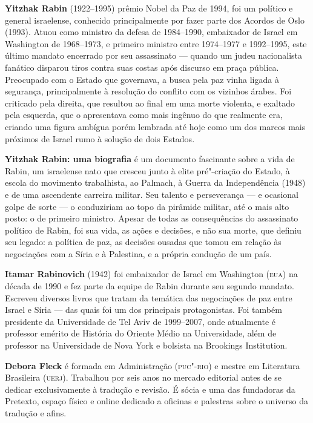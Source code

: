\textbf{Yitzhak Rabin} (1922--1995) prêmio Nobel da Paz de 1994, foi um político e general israelense, conhecido principalmente por fazer parte dos Acordos de Oslo (1993). Atuou como ministro da defesa de 1984--1990, embaixador de Israel em Washington de 1968--1973, e primeiro ministro entre 1974--1977 e 1992--1995, este último mandato encerrado por seu assassinato --- quando um judeu nacionalista fanático disparou tiros contra suas costas após discurso em praça pública. Preocupado com o Estado que governava, a busca pela paz vinha ligada à segurança, principalmente à resolução do conflito com os vizinhos árabes. Foi criticado pela direita, que resultou ao final em uma morte violenta, e exaltado pela esquerda, que o apresentava como mais ingênuo do que realmente era, criando uma figura ambígua porém lembrada até hoje como um dos marcos mais próximos de Israel rumo à solução de dois Estados.

\textbf{Yitzhak Rabin: uma biografia} é um documento fascinante sobre a vida de Rabin, um israelense nato que cresceu junto à elite pré"-criação do Estado, à escola do movimento trabalhista, ao Palmach, à Guerra da Independência (1948) e de uma ascendente carreira militar. Seu talento e perseverança --- e ocasional golpe de sorte --- o conduziriam ao topo da pirâmide militar, até o mais alto posto: o de primeiro ministro. Apesar de todas as consequências do assassinato político de Rabin, foi sua vida, as ações e decisões, e não sua morte, que definiu seu legado: a política de paz, as decisões ousadas que tomou em relação às negociações com a Síria e à Palestina, e a própria condução de um país.

\textbf{Itamar Rabinovich} (1942) foi embaixador de Israel em Washington (\textsc{eua}) na década de 1990 e fez parte da equipe de Rabin durante seu segundo mandato. Escreveu diversos livros que tratam da temática das negociações de paz entre Israel e Síria --- das quais foi um dos principais protagonistas. Foi também presidente da Universidade de Tel Aviv de 1999--2007, onde atualmente é professor emérito de História do Oriente Médio na Universidade, além de professor na Universidade de Nova York e bolsista na Brookings Institution.

\pagebreak

\textbf{Debora Fleck} é formada em Administração (\textsc{puc"-rio}) e mestre em Literatura Brasileira (\textsc{uerj}). Trabalhou por seis anos no mercado editorial antes de se dedicar exclusivamente à tradução e revisão. É sócia e uma das fundadoras da Pretexto, espaço físico e online dedicado a oficinas e palestras sobre o universo da tradução e afins.

